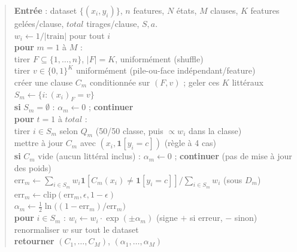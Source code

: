\documentclass[12pt,a4paper]{article}
\begin{document}
\begin{quote}\ttfamily\small
\textbf{Entrée} : dataset $\{(x_i,y_i)\}$, $n$ features, $N$ états, $M$
clauses, $K$ features gelées/clause, $total$ tirages/clause, $S,a$.\\[4pt]
$w_i \gets 1/|\text{train}|$ pour tout $i$\\[2pt]
\textbf{pour} $m = 1$ à $M$ :\\
\hspace*{1.5em}tirer $F\subseteq\{1,\ldots,n\}$, $|F|=K$, uniformément (shuffle)\\
\hspace*{1.5em}tirer $v\in\{0,1\}^K$ uniformément (pile-ou-face indépendant/feature)\\
\hspace*{1.5em}créer une clause $C_m$ conditionnée sur $(F,v)$ ; geler ces $K$ littéraux\\
\hspace*{1.5em}$S_m \gets \{i : (x_i)_F = v\}$\\
\hspace*{1.5em}\textbf{si} $S_m=\emptyset$ : $\alpha_m \gets 0$ ; \textbf{continuer}\\
\hspace*{1.5em}\textbf{pour} $t = 1$ à $total$ :\\
\hspace*{3em}tirer $i\in S_m$ selon $Q_m$ (50/50 classe, puis $\propto w_i$ dans la classe)\\
\hspace*{3em}mettre à jour $C_m$ avec $(x_i,\mathbf 1[y_i{=}c])$ (règle à 4 cas)\\
\hspace*{1.5em}\textbf{si} $C_m$ vide (aucun littéral inclus) : $\alpha_m \gets 0$ ; \textbf{continuer}
\hspace*{1em}(pas de mise à jour des poids)\\
\hspace*{1.5em}$\mathrm{err}_m \gets \sum_{i\in S_m} w_i\mathbf 1[C_m(x_i)\ne\mathbf 1[y_i{=}c]] \big/ \sum_{i\in S_m} w_i$ \hspace*{0.5em}(sous $D_m$)\\
\hspace*{1.5em}$\mathrm{err}_m \gets \mathrm{clip}(\mathrm{err}_m,\epsilon,1-\epsilon)$\\
\hspace*{1.5em}$\alpha_m \gets \tfrac12\ln\bigl((1-\mathrm{err}_m)/\mathrm{err}_m\bigr)$\\
\hspace*{1.5em}\textbf{pour} $i \in S_m$ : $w_i \gets w_i \cdot \exp(\pm\alpha_m)$ (signe $+$ si erreur, $-$ sinon)\\
\hspace*{1.5em}renormaliser $w$ sur tout le dataset\\[4pt]
\textbf{retourner} $(C_1,\ldots,C_M)$, $(\alpha_1,\ldots,\alpha_M)$
\end{quote}
\end{document}
